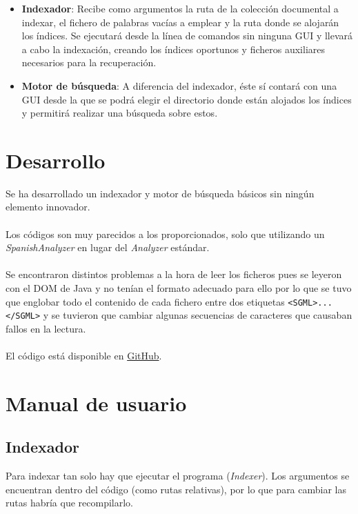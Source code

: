 \begin{itemize}
	\item \textbf{Indexador}: Recibe como argumentos la ruta de la colección documental a indexar, el fichero de palabras vacías a emplear y la ruta donde se alojarán los índices. Se ejecutará desde la línea de comandos sin ninguna GUI y llevará a cabo la indexación, creando los índices oportunos y ficheros auxiliares necesarios para la recuperación.
	\item \textbf{Motor de búsqueda}: A diferencia del indexador, éste sí contará con una GUI desde la que se podrá elegir el directorio donde están alojados los índices y permitirá realizar una búsqueda sobre estos.
\end{itemize}

\section{Desarrollo}
\label{sec:desarrollo}

Se ha desarrollado un indexador y motor de búsqueda básicos sin ningún elemento innovador.
\\ \\
Los códigos son muy parecidos a los proporcionados, solo que utilizando un \textit{SpanishAnalyzer} en lugar del \textit{Analyzer} estándar.
\\ \\
Se encontraron distintos problemas a la hora de leer los ficheros pues se leyeron con el DOM de Java y no tenían el formato adecuado para ello por lo que se tuvo que englobar todo el contenido de cada fichero entre dos etiquetas \texttt{<SGML>...</SGML>} y se tuvieron que cambiar algunas secuencias de caracteres que causaban fallos en la lectura.
\\ \\
El código está disponible en \href{https://github.com/fblupi/master_informatica-GIW/tree/master/P3/InformationRetrievalSystem}{GitHub}.

\section{Manual de usuario}
\label{sec:manual}

\subsection{Indexador}

Para indexar tan solo hay que ejecutar el programa (\textit{Indexer}). Los argumentos se encuentran dentro del código (como rutas relativas), por lo que para cambiar las rutas habría que recompilarlo.

